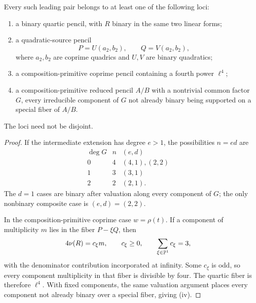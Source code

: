 \documentclass[11pt,reqno]{amsart}
\begin{document}
\begin{proposition}
\label{prop:four-loci}
Every such leading pair belongs to at least one of the following loci:
\begin{enumerate}[label=(\roman*)]
\item a binary quartic pencil, with \(R\) binary in the same two linear
forms;
\item a quadratic-source pencil
\[
P=U(a_2,b_2),\qquad Q=V(a_2,b_2),
\]
where \(a_2,b_2\) are coprime quadrics and \(U,V\) are binary quadratics;
\item a composition-primitive coprime pencil containing a fourth power
\(\ell^4\);
\item a composition-primitive reduced pencil \(A/B\) with a nontrivial
common factor \(G\), every irreducible component of \(G\) not already binary
being supported on a special fiber of \(A/B\).
\end{enumerate}
The loci need not be disjoint.
\end{proposition}

\begin{proof}
If the intermediate extension has degree \(e>1\), the possibilities
\(n=ed\) are
\[
\begin{array}{c|c|c}
\deg G&n&(e,d)\\ \hline
0&4&(4,1),(2,2)\\
1&3&(3,1)\\
2&2&(2,1).
\end{array}
\]
The \(d=1\) cases are binary after valuation along every component of \(G\);
the only nonbinary composite case is \((e,d)=(2,2)\).

In the composition-primitive coprime case \(w=\rho(t)\).  If a component of
multiplicity \(m\) lies in the fiber \(P-\xi Q\), then
\[
4\nu(R)=c_\xi m,\qquad c_\xi\ge0,\qquad
\sum_{\xi\in\mathbb P^1}c_\xi=3,
\]
with the denominator contribution incorporated at infinity.  Some
\(c_\xi\) is odd, so every component multiplicity in that fiber is divisible
by four.  The quartic fiber is therefore \(\ell^4\).  With fixed
components, the same valuation argument places every component not already
binary over a special fiber, giving (iv).
\end{proof}
\end{document}
